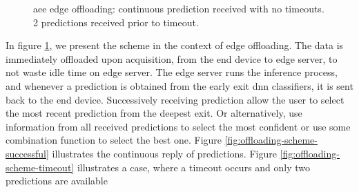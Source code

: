 \begin{figure}
	\captionsetup[subfigure]{justification=centering}
	\centering
\end{figure}
\begin{figure}
		\captionsetup[subfigure]{justification=centering}
	\centering
	\caption[Offloading scheme]{\gls{aee} edge offloading: \protect{} continuous prediction received with no timeouts. \protect{} 2 predictions received prior to timeout. }
	\label{fig:offloading-scheme}
\end{figure} 

In figure \ref{fig:offloading-scheme}, we present the scheme in the context of edge offloading. The data is immediately offloaded upon acquisition, from the end device to edge server, to not waste idle time on edge server. The edge server runs the inference process, and whenever a prediction is obtained from the early exit \gls{dnn} classifiers, it is sent back to the end device. Successively receiving prediction allow the user to select the most recent prediction from the deepest exit. Or alternatively, use information from all received predictions to select the most confident or use some combination function to select the best one. Figure \ref{fig:offloading-scheme-successful} illustrates the continuous reply of predictions. Figure \ref{fig:offloading-scheme-timeout} illustrates a case, where a timeout occurs and only two predictions are available 


